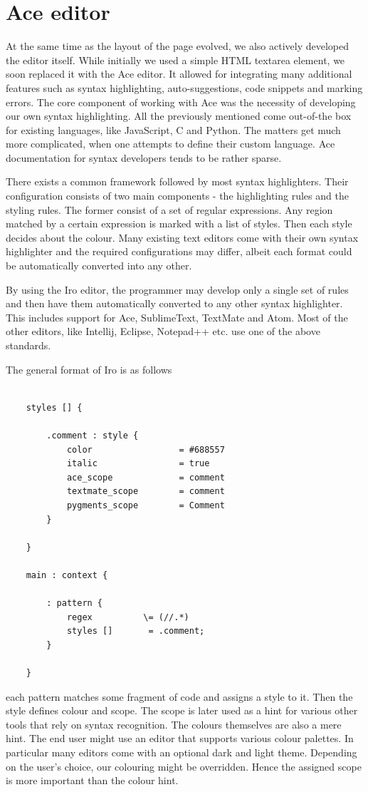 \section{Ace editor}

At the same time as the layout of the page evolved, we also actively developed the editor itself. While initially we used a simple HTML textarea element, we soon replaced it with the Ace editor. It allowed for integrating many additional features such as syntax highlighting, auto-suggestions, code snippets and marking errors. The core component of working with Ace was the necessity of developing our own syntax highlighting. All the previously mentioned come out-of-the box for existing languages, like JavaScript, C and Python. The matters get much more complicated, when one attempts to define their custom language. Ace documentation for syntax developers tends to be rather sparse. 

There exists a common framework followed by most syntax highlighters. Their configuration consists of two main components - the highlighting rules and the styling rules. The former consist of a set of regular expressions. Any region matched by a certain expression is marked with a list of styles. Then each style decides about the colour. Many existing text editors come with their own syntax highlighter and the required configurations may differ, albeit each format could be automatically converted into any other. 

By using the Iro editor, the programmer may develop only a single set of rules and then have them automatically converted to any other syntax highlighter. This includes support for Ace, SublimeText, TextMate and Atom. Most of the other editors, like Intellij, Eclipse, Notepad++ etc. use one of the above standards. 

The general format of Iro is as follows
\begin{lstlisting}
	
	styles [] {
		
		.comment : style {
			color                 = #688557
			italic                = true
			ace_scope             = comment
			textmate_scope        = comment
			pygments_scope        = Comment
		}
		
	}
	
	main : context {
		
		: pattern {
			regex          \= (//.*)
			styles []       = .comment;
		}
		
	}
\end{lstlisting}
each pattern matches some fragment of code and assigns a style to it. Then the style defines colour and scope. The scope is later used as a hint for various other tools that rely on syntax recognition. The colours themselves are also a mere hint. The end user might use an editor that supports various colour palettes. In particular many editors come with an optional dark and light theme. Depending on the user's choice, our colouring might be overridden. Hence the assigned scope is more important than the colour hint.

